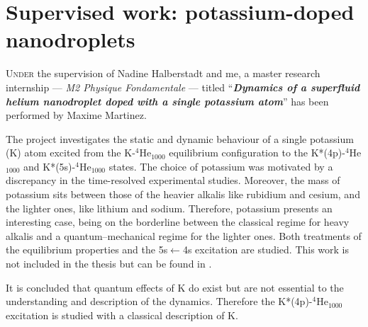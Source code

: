 \chapter{Supervised work: potassium-doped nanodroplets}
	\lettrine[lines=4]{\color{activeColor}U}{nder} the supervision of Nadine Halberstadt and me, a master research internship --- \emph{M2 Physique Fondamentale} --- titled ``\emph{\textbf{Dynamics of a superfluid helium nanodroplet doped with a single potassium atom}}'' has been performed by Maxime Martinez.

	The project investigates the static and dynamic behaviour of a single potassium (K) atom excited from the K-$^4$He$_{1000}$ equilibrium configuration to the K*(4p)-$^4$He$_{1000}$ and K*(5s)-$^4$He$_{1000}$ states. The choice of potassium was motivated by a discrepancy in the time-resolved experimental studies\citep{Schulz2001,Reho2000-1,Reho2000-2}. Moreover, the mass of potassium sits between those of the heavier alkalis like rubidium and cesium, and the lighter ones, like lithium and sodium. Therefore, potassium presents an interesting case, being on the borderline between the classical regime for heavy alkalis and a quantum--mechanical regime for the lighter ones. Both treatments of the equilibrium properties and the 5s$\leftarrow$4s excitation are studied. This work is not included in the thesis but can be found in .
	
	It is concluded that quantum effects of K do exist but are not essential to the understanding and description of the dynamics. Therefore the K*(4p)-$^4$He$_{1000}$ excitation is studied with a classical description of K.
\clearpage{\pagestyle{empty}\cleardoublepage}
